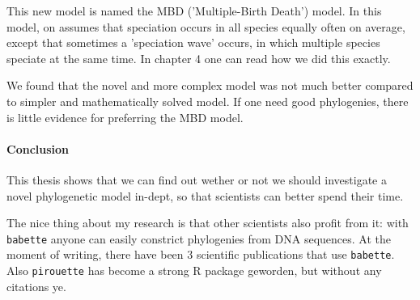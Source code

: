 This new model is named the MBD ('Multiple-Birth Death') model.
In this model, on assumes that speciation occurs in all species
equally often on average, except that sometimes 
a 'speciation wave' occurs, in which multiple species speciate
at the same time. In chapter 4 one can read how we did this exactly.

We found that the novel and more complex model was not much
better compared to simpler and mathematically solved model.
If one need good phylogenies, there is little evidence 
for preferring the MBD model.

\paragraph{Conclusion}

This thesis shows that we can find out wether or not we should investigate
a novel phylogenetic model in-dept, so that scientists can better
spend their time.

The nice thing about my research is that other scientists also profit
from it: with \verb;babette; anyone can easily constrict phylogenies
from DNA sequences. At the moment of writing, there have been 
3 scientific publications that use \verb;babette;.
Also \verb;pirouette; has become a strong R package geworden, but 
without any citations ye.

